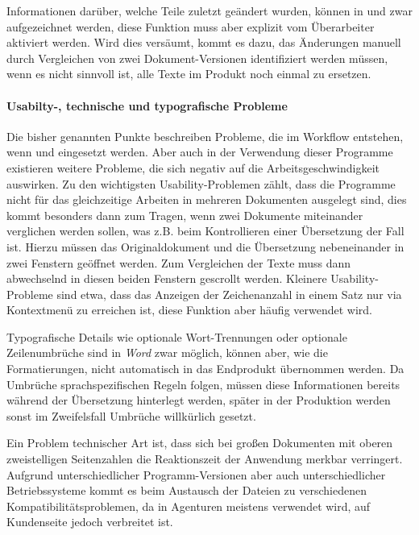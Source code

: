 Informationen darüber, welche Teile zuletzt geändert wurden, können in  und  zwar aufgezeichnet werden, diese Funktion muss aber explizit vom Überarbeiter aktiviert werden. Wird dies versäumt, kommt es dazu, das Änderungen manuell durch Vergleichen von zwei Dokument-Versionen identifiziert werden müssen, wenn es nicht sinnvoll ist, alle Texte im Produkt noch einmal zu ersetzen.

\paragraph{Usabilty-, technische und typografische Probleme} Die bisher genannten Punkte beschreiben Probleme, die im Workflow entstehen, wenn  und  eingesetzt werden. Aber auch in der Verwendung dieser Programme existieren weitere Probleme, die sich negativ auf die Arbeitsgeschwindigkeit auswirken. Zu den wichtigsten Usability-Problemen zählt, dass die Programme nicht für das gleichzeitige Arbeiten in mehreren Dokumenten ausgelegt sind, dies kommt besonders dann zum Tragen, wenn zwei Dokumente miteinander verglichen werden sollen, was z.B. beim Kontrollieren einer Übersetzung der Fall ist. Hierzu müssen das Originaldokument und die Übersetzung nebeneinander in zwei Fenstern geöffnet werden. Zum Vergleichen der Texte muss dann abwechselnd in diesen beiden Fenstern gescrollt werden. Kleinere Usability-Probleme sind etwa, dass das Anzeigen der Zeichenanzahl in einem Satz nur via Kontextmenü zu erreichen ist, diese Funktion aber häufig verwendet wird. 

Typografische Details wie optionale Wort-Trennungen oder optionale Zeilenumbrüche sind in \emph{Word} zwar möglich, können aber, wie die Formatierungen, nicht automatisch in das Endprodukt übernommen werden. Da Umbrüche sprachspezifischen Regeln folgen, müssen diese Informationen bereits während der Übersetzung hinterlegt werden, später in der Produktion werden sonst im Zweifelsfall Umbrüche willkürlich gesetzt. 

Ein Problem technischer Art ist, dass sich bei großen Dokumenten mit oberen zweistelligen Seitenzahlen die Reaktionszeit der Anwendung merkbar verringert. Aufgrund unterschiedlicher Programm-Versionen aber auch unterschiedlicher Betriebssysteme kommt es beim Austausch der Dateien zu verschiedenen Kompatibilitätsproblemen, da in Agenturen meistens  verwendet wird, auf Kundenseite jedoch  verbreitet ist.

\pagebreak

